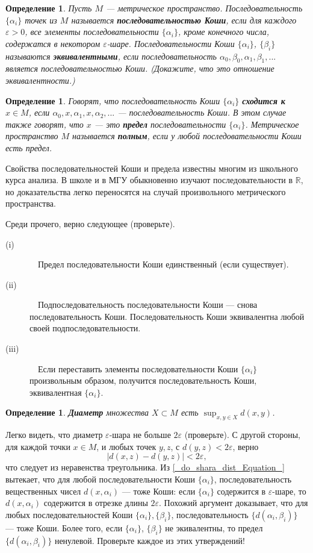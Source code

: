 \documentclass[12pt]{book}
\renewcommand{\epsilon}{\varepsilon}
\def\R{{\mathbb R}}
\theoremstyle{upshape}
\theoremstyle{generic}
\newtheorem{opredelenie}[teorema]{Определение}
\def\еза{\end{remark}}
\theoremstyle{upshapenonumber}
\newcommand{\следствие}{%
     \refstepcounter{teorema}
     {\noindent\bf Следствие \thechapter.\arabic{teorema}:\ }}
\newcommand{\пример}{%
     \refstepcounter{teorema}
     {\noindent\bf Пример \thechapter.\arabic{teorema}:\ }}
\newcommand{\лемма}{%
     \refstepcounter{teorema}
     {\noindent\bf Лемма \thechapter.\arabic{teorema}:\ }}
\newcommand{\теорема}{%
     \refstepcounter{teorema}
     {\noindent\bf Теорема \thechapter.\arabic{teorema}:\ }}
\newcommand{\утверждение}{%
     \refstepcounter{teorema}
     {\noindent\bf Утверждение \thechapter.\arabic{teorema}:\ }}
\def\бф{\bf}
\def\ем{\em}
\def\ез{\end{zadacha}}
\def\еу{\end{ukazanie}}
\def\определение{\begin{opredelenie}}
\def\ео{\end{opredelenie}}
\def\енум{\begin{enumerate}}
\def\ее{\end{enumerate}}
\begin{document}
\определение
Пусть $M$ --- метрическое пространство. 
Последовательность $\{\alpha_i\}$ точек из $M$ называется
{\бф последовательностью Коши}, если для каждого 
$\epsilon>0$, все элементы последовательности 
$\{\alpha_i\}$, кроме конечного числа, содержатся в некотором
$\epsilon$-шаре. Последовательности Коши 
$\{\alpha_i\}$,  $\{\beta_i\}$ называются 
{\бф эквивалентными}, если последовательность
$\alpha_0, \beta_0, \alpha_1, \beta_1, ...$
является последовательностью Коши. (Докажите, 
что это отношение эквивалентности.)
\ео

\определение
Говорят, что последовательность Коши $\{\alpha_i\}$
{\бф сходится к $x\in M$}, если
$\alpha_0, x, \alpha_1, x, \alpha_2, ...$ --- 
последовательность Коши. В этом случае также говорят,
что $x$ --- это {\бф предел} последовательности
$\{\alpha_i\}$. Метрическое пространство $M$
называется {\бф полным}, если у любой
последовательности Коши есть предел.
\ео

Свойства последовательностей Коши и предела известны 
многим  из школьного курса анализа. В школе
и в МГУ обыкновенно изучают последовательности
в $\R$, но доказательства легко переносятся 
на случай произвольного метрического пространства.

Среди прочего, верно следующее (проверьте).


\begin{description}
\item[(i)]\ \ Предел последовательности Коши единственный
(если существует).
\item[(ii)] \ \ Подпоследовательность последовательности
Коши --- снова последовательность Коши. Последовательность Коши
эквивалентна любой своей подпоследовательности.
\item[(iii)] \ \ Если переставить элементы последовательности
Коши $\{\alpha_i\}$ произвольным образом, получится последовательность
Коши, эквивалентная $\{\alpha_i\}$.
\end{description}

\определение
{\бф Диаметр} множества $X\subset M$ есть
$\sup_{x,y \in X} d(x,y)$. 
\ео

Легко видеть, что диаметр
$\epsilon$-шара не больше $2\epsilon$ (проверьте).
С другой стороны, для каждой точки $x\in M$,
и любых точек $y,z$, с $d(y,z)< 2\epsilon$,
верно 
\begin{equation}\label{_do_shara_dist_Equation_}
| d(x, z)-d(y, z)| < 2\epsilon,
\end{equation} что
следует из неравенства треугольника.
Из \eqref{_do_shara_dist_Equation_} 
вытекает, что для любой последовательности
Коши $\{\alpha_i\}$, последовательность вещественных
чисел $d(x, \alpha_i)$ --- тоже Коши:
если $\{\alpha_i\}$ содержится в $\epsilon$-шаре, то
$d(x, \alpha_i)$ содержится в отрезке длины $2\epsilon$.
Похожий аргумент доказывает, что для любых
последовательностей Коши $\{\alpha_i\}, \{\beta_i\}$, последовательность
$\{d(\alpha_i, \beta_i)\}$ --- тоже  Коши.
Более того, если $\{\alpha_i\}$,  $\{\beta_i\}$
не экивалентны, то предел $\{d(\alpha_i, \beta_i)\}$
ненулевой. Проверьте каждое из этих утверждений!
\end{document}
